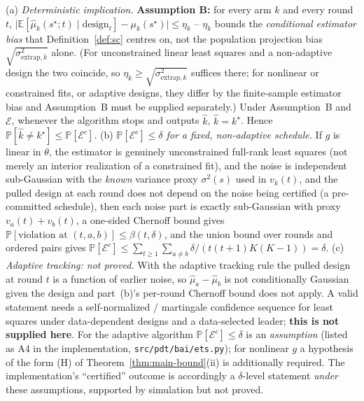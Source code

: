 \begin{theorem}
\label{thm:algorithm-correctness}
(a) \emph{Deterministic implication.} \textbf{Assumption B:} for every arm $k$ and every
round $t$, $\big|\mathbb{E}[\hat\mu_k(s^\star;t) \mid \text{design}_t] - \mu_k(s^\star)\big|
\le \eta_k$ -- $\eta_k$ bounds the \emph{conditional estimator bias} that
Definition~\ref{def:sc} centres on, not the population projection bias
$\sqrt{\sigma^2_{\mathrm{extrap},k}}$ alone. (For unconstrained linear least squares and a
non-adaptive design the two coincide, so $\eta_k \ge \sqrt{\sigma^2_{\mathrm{extrap},k}}$
suffices there; for nonlinear or constrained fits, or adaptive designs, they differ by the
finite-sample estimator bias and Assumption~B must be supplied separately.) Under
Assumption~B and $\mathcal{E}$, whenever the algorithm stops and outputs $\hat{k}$, $\hat{k} =
k^\star$. Hence $\mathbb{P}[\hat{k} \ne k^\star] \le \mathbb{P}[\mathcal{E}^c]$.
(b) \emph{$\mathbb{P}[\mathcal{E}^c] \le \delta$ for a fixed, non-adaptive schedule.} If $g$ is linear
in $\theta$, the estimator is genuinely unconstrained full-rank least squares
(not merely an interior realization of a constrained fit), and the noise is
independent sub-Gaussian with the \emph{known} variance proxy
$\sigma^2(s)$ used in $v_k(t)$, and the pulled design at each round does not depend on the
noise being certified (a pre-committed schedule), then each noise part is exactly
sub-Gaussian with proxy $v_a(t) + v_b(t)$, a one-sided Chernoff bound gives
$\mathbb{P}[\text{violation at }(t,a,b)] \le \beta(t,\delta)$, and the union bound over rounds and
ordered pairs gives $\mathbb{P}[\mathcal{E}^c] \le \sum_{t \ge 1} \sum_{a \ne b}
\delta / (t(t+1)K(K-1)) = \delta$.
(c) \emph{Adaptive tracking: not proved.} With the adaptive tracking rule the pulled design at
round $t$ is a function of earlier noise, so $\hat\mu_a - \hat\mu_b$ is not conditionally
Gaussian given the design and part~(b)'s per-round Chernoff bound does not apply. A
valid statement needs a self-normalized / martingale confidence sequence for
least squares under data-dependent designs and a data-selected leader; \textbf{this is not
supplied here}. For the adaptive algorithm $\mathbb{P}[\mathcal{E}^c] \le \delta$ is an
\emph{assumption} (listed as A4 in the implementation, \texttt{src/pdt/bai/ets.py}); for
nonlinear $g$ a hypothesis of the form (H) of Theorem~\ref{thm:main-bound}(ii) is
additionally required. The implementation's ``certified'' outcome is
accordingly a $\delta$-level statement \emph{under} these assumptions, supported by simulation
but not proved.
\end{theorem}

